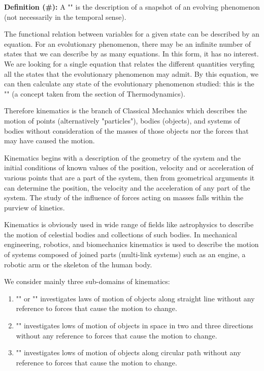 	\textbf{Definition (\#\mydef):} A "" is the description of a snapshot of an evolving phenomenon (not necessarily in the temporal sense).

	The functional relation between variables for a given state can be described by an equation. For an evolutionary phenomenon, there may be an infinite number of states that we can describe by as many equations. In this form, it has no interest. We are looking for a single equation that relates the different quantities veryfing all the states that the evolutionary phenomenon may admit. By this equation, we can then calculate any state of the evolutionary phenomenon studied: this is the "" (a concept taken from the section of Thermodynamics).

	Therefore kinematics is the branch of Classical Mechanics which describes the motion of points (alternatively "particles"), bodies (objects), and systems of bodies without consideration of the masses of those objects nor the forces that may have caused the motion.
	
	Kinematics begins with a description of the geometry of the system and the initial conditions of known values of the position, velocity and or acceleration of various points that are a part of the system, then from geometrical arguments it can determine the position, the velocity and the acceleration of any part of the system. The study of the influence of forces acting on masses falls within the purview of kinetics.
	
	Kinematics is obviously used in wide range of fields like astrophysics to describe the motion of celestial bodies and collections of such bodies. In mechanical engineering, robotics, and biomechanics kinematics is used to describe the motion of systems composed of joined parts (multi-link systems) such as an engine, a robotic arm or the skeleton of the human body.
	
	We consider mainly three sub-domains of kinematics:
	\begin{enumerate}
		\item "" or "" investigates laws of motion of objects along straight line without any reference to forces that cause the motion to change.

		\item "" investigates lows of motion of objects in space in two and three directions without any reference to forces that cause the motion to change.

		\item "" investigates lows of motion of objects along circular path without any reference to forces that cause the motion to change.
	\end{enumerate}
	
